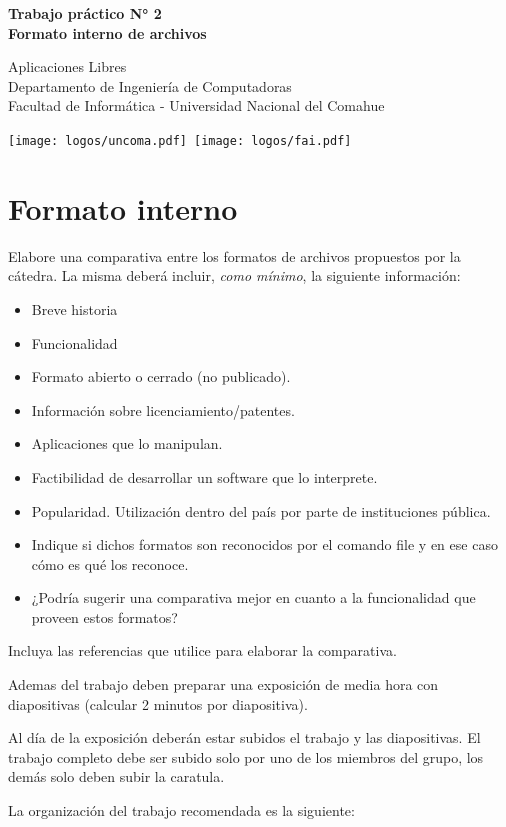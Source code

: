 \documentclass[12pt]{article}
\def\maketitle{

 \makeatletter
 {\color{bl} \centering \huge \sc \textbf{
Trabajo práctico N° 2\\
\large \vspace*{-8pt} \color{black} Formato interno de archivos
 \vspace*{8pt} }\par}
 \makeatother


 \makeatletter
 {\centering \small 
	Aplicaciones Libres\\
 	Departamento de Ingeniería de Computadoras \\
 	Facultad de Informática - Universidad Nacional del Comahue \\
 	\vspace{20pt} }
 \makeatother

\vspace{-2.5cm}
\mbox{\hspace{-1cm}\texttt{[image: logos/uncoma.pdf]}\hspace{12cm}
    \texttt{[image: logos/fai.pdf]}}

}
\begin{document}
\thispagestyle{empty}
\maketitle
\setlength{\parindent}{0pt}

\section*{Formato interno}

Elabore una comparativa entre los formatos de archivos propuestos por la 
cátedra. La misma deberá incluir, {\it como mínimo}, la siguiente información:
\begin{itemize} 
\item Breve historia
\item Funcionalidad
\item Formato abierto o cerrado (no publicado).
\item Información sobre licenciamiento/patentes.
\item Aplicaciones que lo manipulan. 
\item Factibilidad de desarrollar un software que lo interprete. 
\item Popularidad. Utilización dentro del país por parte de instituciones pública.  
\item Indique si dichos formatos son reconocidos por el comando file y en 
ese caso cómo es qué los reconoce.   
\item ¿Podría sugerir una comparativa mejor en cuanto a la funcionalidad que proveen estos formatos?
\end{itemize} 

Incluya las referencias que utilice para elaborar la comparativa. 

Ademas del trabajo deben preparar una exposición de media hora con
diapositivas (calcular 2 minutos por diapositiva).

Al día de la exposición deberán estar subidos el trabajo y las diapositivas.
El trabajo completo debe ser subido solo por uno de los miembros del grupo,
los demás solo deben subir la caratula.

La organización del trabajo recomendada es la siguiente:
\end{document}
